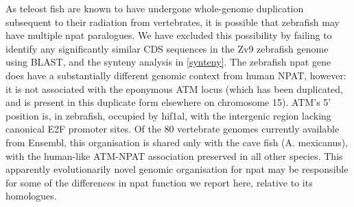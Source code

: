As teleost fish are known to have undergone whole-genome duplication subsequent to their radiation from vertebrates, it is possible that zebrafish may have multiple npat paralogues. We have excluded this possibility by failing to identify any significantly similar CDS sequences in the Zv9 zebrafish genome using BLAST, and the synteny analysis in \autoref{synteny}. The zebrafish npat gene does have a substantially different genomic context from human NPAT, however: it is not associated with the eponymous ATM locus (which has been duplicated, and is present in this duplicate form elsewhere on chromosome 15). ATM’s 5’ position is, in zebrafish, occupied by hif1al, with the intergenic region lacking canonical E2F promoter sites. Of the 80 vertebrate genomes currently available from Ensembl, this organisation is shared only with the cave fish (A. mexicanus), with the human-like ATM-NPAT association preserved in all other species. This apparently evolutionarily novel genomic organisation for npat may be responsible for some of the differences in npat function we report here, relative to its homologues.


